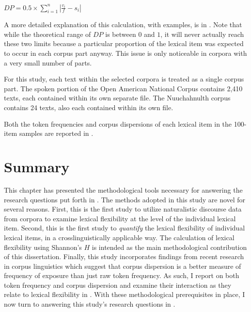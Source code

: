 \begin{exe}
  \ex\label{ex:DP}
  $DP = 0.5 \times \displaystyle\sum_{i = 1}^{n}|\frac{v_i}{f} - s_i|$
\end{exe}

\noindent A more detailed explanation of this calculation, with examples, is in \textcite[§3]{Gries2008}. Note that while the theoretical range of $DP$ is between $0$ and $1$, it will never actually reach these two limits because a particular proportion of the lexical item was expected to occur in each corpus part anyway. This issue is only noticeable in corpora with a very small number of parts.

For this study, each text within the selected corpora is treated as a single corpus part. The spoken portion of the Open American National Corpus contains 2,410 texts, each contained within its own separate file. The Nuuchahnulth corpus contains 24 texts, also each contained within its own file.

Both the token frequencies and corpus dispersions of each lexical item in the 100-item samples are reported in .

\section{Summary}
\label{sec:3.5}

This chapter has presented the methodological tools necessary for answering the research questions put forth in . The methods adopted in this study are novel for several reasons. First, this is the first study to utilize naturalistic discourse data from corpora to examine lexical flexibility at the level of the individual lexical item. Second, this is the first study to \emph{quantify} the lexical flexibility of individual lexical items, in a crosslinguistically applicable way. The calculation of lexical flexibility using Shannon's $H$ is intended as the main methodological contribution of this dissertation. Finally, this study incorporates findings from recent research in corpus linguistics which suggest that corpus dispersion is a better measure of frequency of exposure than just raw token frequency. As such, I report on both token frequency and corpus dispersion and examine their interaction as they relate to lexical flexibility in . With these methodological prerequisites in place, I now turn to answering this study's research questions in .
